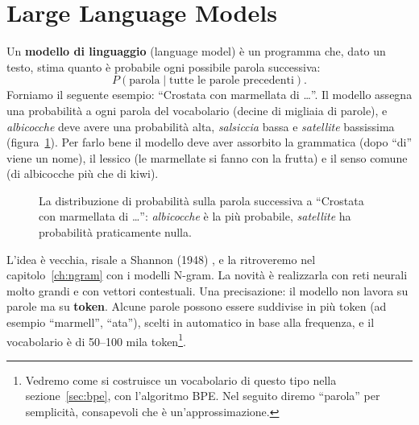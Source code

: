 \section{Large Language Models}\label{sec:llm}
Un \textbf{modello di linguaggio} (language model) è un programma che, dato un testo, stima quanto è probabile ogni possibile parola successiva:
\[
P(\text{parola} \mid \text{tutte le parole precedenti}).
\]
Forniamo il seguente esempio: \enquote{Crostata con marmellata di \dots}. Il modello assegna una probabilità a ogni parola del vocabolario (decine di migliaia di parole), e \textit{albicocche} deve avere una probabilità alta, \textit{salsiccia} bassa e \textit{satellite} bassissima (figura~\ref{fig:next-word}). Per farlo bene il modello deve aver assorbito la grammatica (dopo \enquote{di} viene un nome), il lessico (le marmellate si fanno con la frutta) e il senso comune (di albicocche più che di kiwi).

\begin{figure}[htbp]
\centering
{}
\caption{La distribuzione di probabilità sulla parola successiva a \enquote{Crostata con marmellata di \dots}: \textit{albicocche} è la più probabile, \textit{satellite} ha probabilità praticamente nulla.}
\label{fig:next-word}
\end{figure}

L'idea è vecchia, risale a Shannon (1948) \cite{shannon1948}, e la ritroveremo nel capitolo~\ref{ch:ngram} con i modelli N-gram. La novità è realizzarla con reti neurali molto grandi e con vettori contestuali. Una precisazione: il modello non lavora su parole ma su \textbf{token}. Alcune parole possono essere suddivise in più token (ad esempio \enquote{marmell}, \enquote{ata}), scelti in automatico in base alla frequenza, e il vocabolario è di 50--100 mila token\footnote{Vedremo come si costruisce un vocabolario di questo tipo nella sezione~\ref{sec:bpe}, con l'algoritmo BPE. Nel seguito diremo \enquote{parola} per semplicità, consapevoli che è un'approssimazione.}.

